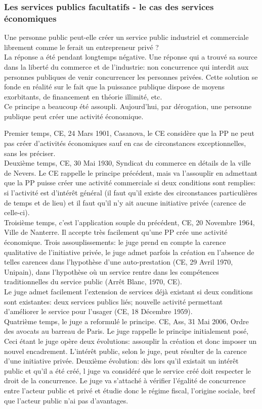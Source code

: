 \documentclass[10pt, a4paper, openany]{book}
\begin{document}
\subsubsection{Les services publics facultatifs - le cas des services économiques}

Une personne public peut-elle créer un service public industriel et commerciale librement comme le ferait un entrepreneur privé ? \\
La réponse a été pendant longtemps négative. Une réponse qui a trouvé sa source dans la liberté du commerce et de l'industrie: non concurrence qui interdit aux personnes publiques de venir concurrencer les personnes privées. Cette solution se fonde en réalité sur le fait que la puissance publique dispose de moyens exorbitants, de financement en théorie illimité, etc. \\
Ce principe a beaucoup été assoupli. Aujourd'hui, par dérogation, une personne publique peut créer une activité économique. 


Premier temps, CE, 24 Mars 1901, Casanova, le CE considère que la PP ne peut pas créer d'activités économiques sauf en cas de circonstances exceptionnelles, sans les préciser. \\
Deuxième temps, CE, 30 Mai 1930, Syndicat du commerce en détails de la ville de Nevers. Le CE rappelle le principe précédent, mais va l'assouplir en admettant que la PP puisse créer une activité commerciale si deux conditions sont remplies: si l'activité est d'intérêt général (il faut qu'il existe des circonstances particulières de temps et de lieu) et il faut qu'il n'y ait aucune initiative privée (carence de celle-ci). \\
Troisième temps, c'est l'application souple du précédent, CE, 20 Novembre 1964, Ville de Nanterre. Il accepte très facilement qu'une PP crée une activité économique. Trois assouplissements: le juge prend en compte la carence qualitative de l'initiative privée, le juge admet parfois la création en l'absence de telles carences dans l'hypothèse d'une auto-prestation (CE, 29 Avril 1970, Unipain), dans l'hypothèse où un service rentre dans les compétences traditionnelles du service public (Arrêt Blanc, 1970, CE). \\
Le juge admet facilement l'extension de services déjà existant si deux conditions sont existantes: deux  services publics liés; nouvelle activité permettant d'améliorer le service pour l'usager (CE, 18 Décembre 1959). \\
Quatrième temps, le juge a reformulé le principe. CE, Ass, 31 Mai 2006, Ordre des avocats au barreau de Paris. Le juge rappelle le principe initialement posé, Ceci étant le juge opère deux évolutions: assouplir la création et donc imposer un nouvel encadrement. L'intérêt public, selon le juge, peut résulter de la carence d'une initiative privée.  Deuxième évolution: dès lors qu'il existait un intérêt public et qu'il a été créé, l juge va considéré que le service créé doit respecter le droit de la concurrence. Le juge va s'attaché à vérifier l'égalité de concurrence entre l'acteur public et privé  et étudie donc le régime fiscal, l'origine sociale, bref que l'acteur public n'ai pas d'avantages. 
\end{document}

